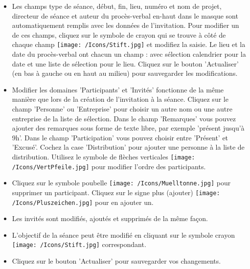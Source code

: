 \begin{figure}[H]
\end{figure}

\begin{itemize}
\item
Les champs type de séance, début, fin, lieu, numéro et nom de projet, directeur de séance et auteur du procès-verbal en-haut dans le masque sont automatiquement remplis avec les données de l'invitation. Pour modifier un de ces champs, cliquez sur le symbole de crayon qui se trouve à côté de chaque champ \texttt{[image: /Icons/Stift.jpg]}  et modifiez la saisie. Le lieu et la date du procès-verbal ont chacun un champ : avec sélection calendrier pour la date et une liste de sélection pour le lieu. Cliquez sur le bouton 'Actualiser'  (en bas à gauche ou en haut au milieu) pour sauvegarder les modifications.
\item
Modifier les domaines 'Participants' et 'Invités'  fonctionne de la même manière que lors de la création de l'invitation à la séance. Cliquez sur le champ 'Personne'  ou 'Entreprise'  pour choisir un autre nom ou une autre entreprise de la liste de sélection. Dans le champ 'Remarques'  vous pouvez ajouter des remarques sous forme de texte libre, par exemple 'présent jusqu'à 9h'. Dans le champ 'Participation'  vous pouvez choisir entre 'Présent' et 'Excusé'. Cochez la case 'Distribution'  pour ajouter une personne à la liste de distribution. Utilisez le symbole de flèches verticales \texttt{[image: /Icons/VertPfeile.jpg]}  pour modifier l'ordre des participants.
\item
Cliquez sur le symbole poubelle \texttt{[image: /Icons/Muelltonne.jpg]}  pour supprimer un participant. Cliquez sur le signe plus (ajouter) \texttt{[image: /Icons/Pluszeichen.jpg]}  pour en ajouter un.
\item
Les invités sont modifiés, ajoutés et supprimés de la même façon.
\item
L'objectif de la séance peut être modifié en cliquant sur le symbole crayon \texttt{[image: /Icons/Stift.jpg]}  correspondant.
\item
Cliquez sur le bouton 'Actualiser'  pour sauvegarder vos changements.
\end{itemize}

